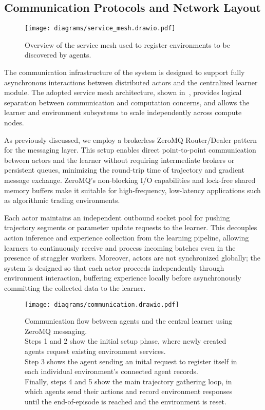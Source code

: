 \documentclass[11pt]{article}
\begin{document}
    \subsection{Communication Protocols and Network Layout}
    \label{subsec:communication}

    \begin{figure}[htb]
        \centering
        \texttt{[image: diagrams/service\_mesh.drawio.pdf]}
        \caption{Overview of the service mesh used to register environments to be discovered by agents.}
        \label{fig:service_mesh}
    \end{figure}

    The communication infrastructure of the system is designed to support fully asynchronous interactions
    between distributed actors and the centralized learner module.
    The adopted service mesh architecture, shown in~, 
    provides logical separation between communication and computation concerns,
    and allows the learner and environment subsystems to scale independently across compute nodes.

    As previously discussed, we employ a brokerless ZeroMQ Router/Dealer pattern for the messaging layer.
    This setup enables direct point-to-point communication between actors and the learner without requiring intermediate brokers or persistent queues,
    minimizing the round-trip time of trajectory and gradient message exchange.
    ZeroMQ's non-blocking I/O capabilities and lock-free shared memory buffers make it suitable for high-frequency,
    low-latency applications such as algorithmic trading environments.

    Each actor maintains an independent outbound socket pool for pushing trajectory segments or parameter update requests to the learner.
    This decouples action inference and experience collection from the learning pipeline,
    allowing learners to continuously receive and process incoming batches even in the presence of straggler workers.
    Moreover, actors are not synchronized globally; the system is designed so that each actor proceeds independently through environment interaction,
    buffering experience locally before asynchronously committing the collected data to the learner.

    \begin{figure}[htb]
        \centering
        \texttt{[image: diagrams/communication.drawio.pdf]}
        \caption{
            Communication flow between agents and the central learner using ZeroMQ messaging.\\
            Steps 1 and 2 show the initial setup phase, where newly created agents request existing environment services.\\
            Step 3 shows the agent sending an inital request to register itself in each individual environment's connected agent records.\\
            Finally, steps 4 and 5 show the main trajectory gathering loop, in which agents send their actions and
            record environment responses until the end-of-episode is reached and the environment is reset.
        }
        \label{fig:communication}
    \end{figure}
\end{document}
